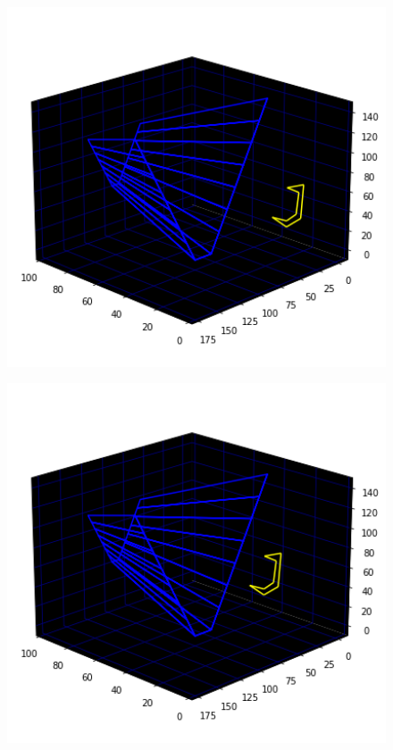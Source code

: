 \begin{minipage}[c]{0.31\linewidth}
\begin{figure}[H]
    \centering
    \begin{adjustbox}{width=5.5cm,center}
      \includegraphics[width=12cm]{src/jump/web_1.png}%
    \end{adjustbox}
\end{figure}
\end{minipage}
\begin{minipage}[c]{0.31\linewidth}
\begin{figure}[H]
    \centering
    \begin{adjustbox}{width=5.5cm,center}
      \includegraphics[width=12cm]{src/jump/web_15.png}%
    \end{adjustbox}
\end{figure}
\end{minipage}
